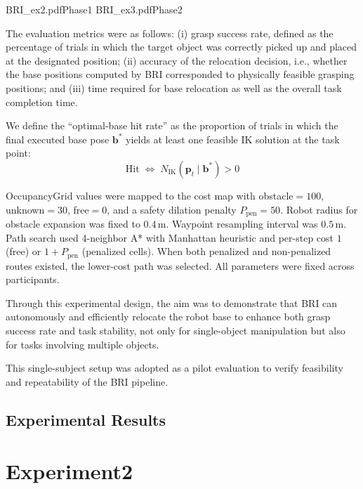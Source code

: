 \documentclass[../../main.tex]{subfiles} %
\begin{document}
  {BRI_ex2.pdf}{Phase1}
  {BRI_ex3.pdf}{Phase2}
\label{fig:bri_overview}



The evaluation metrics were as follows: 
(i) grasp success rate, defined as the percentage of trials in which 
the target object was correctly picked up and placed at the designated position; 
(ii) accuracy of the relocation decision, i.e., whether the base positions 
computed by BRI corresponded to physically feasible grasping positions; 
and (iii) time required for base relocation as well as the overall task 
completion time.


We define the ``optimal-base hit rate'' as the proportion of trials in which
the final executed base pose $\mathbf{b}^{\ast}$ yields at least one feasible IK
solution at the task point:
\[
\mathrm{Hit} \;\Leftrightarrow\; N_{\mathrm{IK}}\!\left(\mathbf{p}_t \mid \mathbf{b}^{\ast}\right) > 0
\]



OccupancyGrid values were mapped to the cost map with
obstacle$=100$, unknown$=30$, free$=0$, and a safety dilation penalty $P_{\text{pen}}=50$.
Robot radius for obstacle expansion was fixed to $0.4\,\mathrm{m}$.
Waypoint resampling interval was $0.5\,\mathrm{m}$.
Path search used 4-neighbor A* with Manhattan heuristic and per-step cost
$1$ (free) or $1+P_{\text{pen}}$ (penalized cells).
When both penalized and non-penalized routes existed, the lower-cost path was selected.
All parameters were fixed across participants.

Through this experimental design, the aim was to demonstrate 
that BRI can autonomously 
and efficiently relocate the robot base to enhance both grasp success 
rate and task stability, 
not only for single-object manipulation but also for tasks involving multiple objects.

This single-subject setup was adopted as a pilot evaluation to verify feasibility and repeatability of the BRI pipeline.


\subsection{Experimental Results}




\section{Experiment2}
\end{document}
